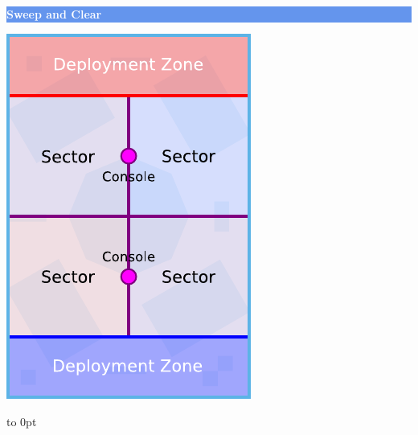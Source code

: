 \documentclass[14pt,dvipsnames]{extarticle}
\begin{document}
\hfill
\begin{minipage}{2in}\centering
\colorbox{CornflowerBlue}{\parbox[t][12pt]{\linewidth}{\centering\textcolor{White}{\textbf{Sweep and Clear}}}}

\smallskip
\includegraphics[scale=0.9]{maps/map-sweepandclear}
\end{minipage}
\hfill
\hbox to 0pt{}
\end{document}
